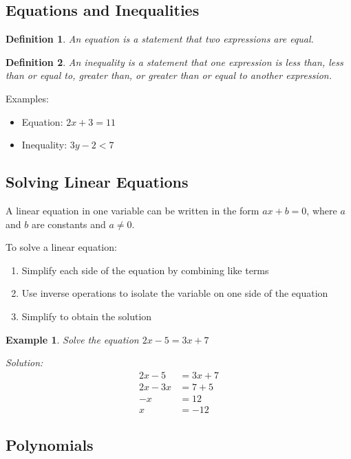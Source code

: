 \documentclass[12pt,a4paper]{article}
\newtheorem{definition}{Definition}
\newtheorem{example}{Example}
\begin{document}
\subsection{Equations and Inequalities}

\begin{definition}
An equation is a statement that two expressions are equal.
\end{definition}

\begin{definition}
An inequality is a statement that one expression is less than, less than or equal to, greater than, or greater than or equal to another expression.
\end{definition}

Examples:
\begin{itemize}
    \item Equation: $2x + 3 = 11$
    \item Inequality: $3y - 2 < 7$
\end{itemize}

\subsection{Solving Linear Equations}

A linear equation in one variable can be written in the form $ax + b = 0$, where $a$ and $b$ are constants and $a \neq 0$.

To solve a linear equation:
\begin{enumerate}
    \item Simplify each side of the equation by combining like terms
    \item Use inverse operations to isolate the variable on one side of the equation
    \item Simplify to obtain the solution
\end{enumerate}

\begin{example}
Solve the equation $2x - 5 = 3x + 7$

Solution:
\begin{align*}
    2x - 5 &= 3x + 7 \\
    2x - 3x &= 7 + 5 \\
    -x &= 12 \\
    x &= -12
\end{align*}
\end{example}

\subsection{Polynomials}
\end{document}
